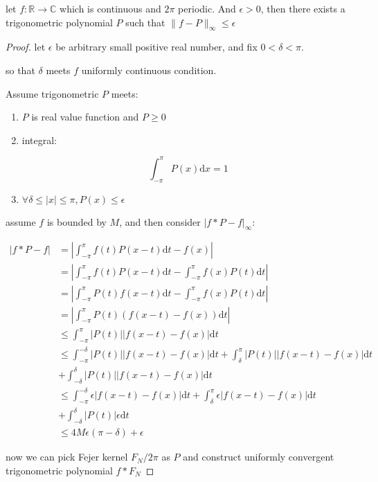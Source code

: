 \begin{thm}
    \label{thm:trigonometric-polynomial-uniformly-convergence}
    let $f: \mathbb{R} \to \mathbb{C}$ which is continuous and $2\pi$ periodic. And $\epsilon > 0$, then there exists
    a trigonometric polynomial $P$ such that $\| f - P\|_\infty \le \epsilon$
\end{thm}

\begin{proof}
    let $\epsilon$ be arbitrary small positive real number, and fix $0 < \delta < \pi$.

    so that $\delta$ meets $f$ uniformly continuous condition.
    
    Assume trigonometric $P$ meets:

    \begin{enumerate}
        \item $P$ is real value function and $P \ge 0$

        \item integral:
        
        \[
            \int_{-\pi}^{\pi} P(x) \mathrm{d}x  = 1
        \]

        \item $\forall \delta \le |x| \le \pi, P(x) \le \epsilon$
    \end{enumerate}

    assume $f$ is bounded by $M$, and then consider $\left| f \ast P - f \right|_\infty$:

    \begin{align*}
        \left| f \ast P - f \right| &= \left| \int_{-\pi}^{\pi}f(t) P(x-t)\mathrm{d}t - f(x) \right| \\
        &= \left| \int_{-\pi}^{\pi}f(t) P(x-t)\mathrm{d}t - \int_{-\pi}^{\pi}f(x) P(t) \mathrm{d}t\right| \\
        &= \left| \int_{-\pi}^{\pi}P(t) f(x-t)\mathrm{d}t - \int_{-\pi}^{\pi}f(x) P(t) \mathrm{d}t\right| \\
        &= \left| \int_{-\pi}^{\pi}P(t) \left(f(x-t) - f(x)\right)  \mathrm{d}t\right| \\ 
        &\le  \int_{-\pi}^{\pi} \left| P(t) \right| \left|f(x-t) - f(x)\right|  \mathrm{d}t \\ 
        &\le  \int_{-\pi}^{-\delta} \left| P(t) \right| \left|f(x-t) - f(x)\right|  \mathrm{d}t + \int_{\delta}^{\pi} \left| P(t) \right| \left|f(x-t) - f(x)\right|  \mathrm{d}t \\ 
        & + \int_{-\delta}^{\delta} \left| P(t) \right| \left|f(x-t) - f(x)\right|  \mathrm{d}t \\
        & \le \int_{-\pi}^{-\delta} \epsilon \left|f(x-t) - f(x)\right| \mathrm{d}t + \int_{\delta}^{\pi} \epsilon \left|f(x-t) - f(x)\right| \mathrm{d}t \\
        & + \int_{-\delta}^{\delta} \left| P(t) \right| \epsilon  \mathrm{d}t \\
        & \le 4M\epsilon(\pi-\delta) + \epsilon
    \end{align*}

    now we can pick Fejer kernel $F_N/2\pi$ as $P$ and construct uniformly convergent trigonometric polynomial $f \ast F_N$
\end{proof}

